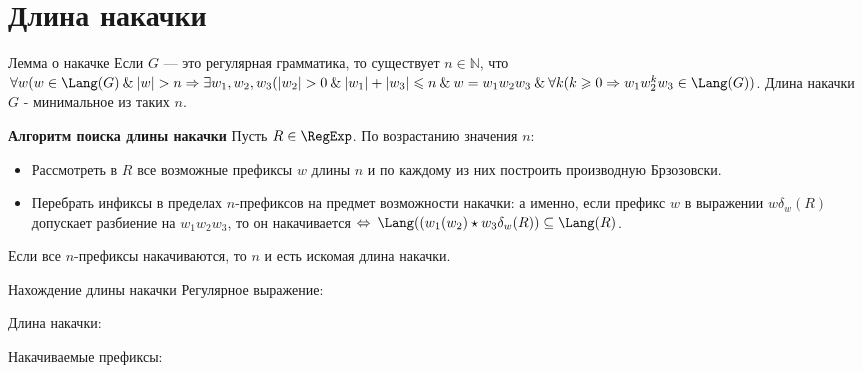 \section{Длина накачки}
\begin{frame}{Лемма о накачке}
    \vspace{-5pt}
    Если $G$ — это регулярная грамматика, то существует $n \in \mathbb{N}$, что $\forall w(w \in \Lang(G) \:  \& \: |w| > n \Rightarrow \exists w_1, w_2, w_3(|w_2| > 0 \: \&  \: |w_1| + |w_3| \leqslant n \: \& \: w = w_1w_2w_3 \: \& \: \forall k(k\geqslant0 \Rightarrow w_1w_2^kw_3 \in \Lang(G))$. Длина накачки $G$ - минимальное из таких $n$.
    \begin{block}{\bf Алгоритм поиска длины накачки}
    Пусть $R\in\RegExp$. По возрастанию значения $n$:
    \begin{itemize}
        \item Рассмотреть в $R$ все возможные префиксы $w$ длины $n$ и по каждому из них построить производную Брзозовски.
        \item Перебрать инфиксы в пределах $n$-префиксов на предмет возможности накачки: а именно, если префикс $w$ в выражении $w\delta_w(R)$ допускает разбиение на $w_1w_2w_3$, то он накачивается $\Leftrightarrow \: \Lang((w_1(w_2) \star w_3\delta_w(R)) \subseteq \Lang(R)$.
    \end{itemize}
    Если все $n$-префиксы накачиваются, то $n$ и есть искомая длина накачки.
    \end{block}
\end{frame} %
\begin{frame}{Нахождение длины накачки}
    \vspace{-5pt}
    Регулярное выражение:

	Длина накачки:

    Накачиваемые префиксы:
    
\end{frame}

